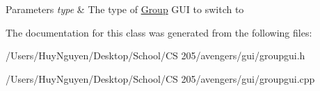 \begin{DoxyParams}{Parameters}
{\em type} & The type of \hyperlink{classGroup}{Group} G\+UI to switch to \\
\hline
\end{DoxyParams}


The documentation for this class was generated from the following files\+:\begin{DoxyCompactItemize}
\item 
/\+Users/\+Huy\+Nguyen/\+Desktop/\+School/\+C\+S 205/avengers/gui/groupgui.\+h\item 
/\+Users/\+Huy\+Nguyen/\+Desktop/\+School/\+C\+S 205/avengers/gui/groupgui.\+cpp\end{DoxyCompactItemize}
